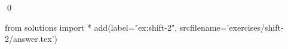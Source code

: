 
\begin{ex} 
  \label{ex:shift-2}
  
  \qed
\end{ex} 
\begin{python0}
from solutions import *
add(label="ex:shift-2",
    srcfilename='exercises/shift-2/answer.tex') 
\end{python0}
